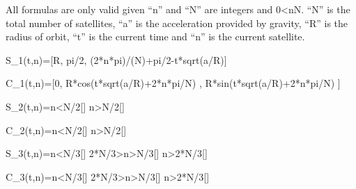 \centerline{All formulas are only valid given “n” and “N” are integers and 0<nN. “N” is the total number of satellites, “a” is the acceleration provided by gravity, “R” is the radius of orbit, “t” is the current time and “n” is the current satellite.}

\centerline{S_1(t,n)=[R, pi/2, (2*n*pi)/(N)+pi/2-t*sqrt(a/R)]}

\centerline{C_1(t,n)=[0, R*cos(t*sqrt(a/R)+2*n*pi/N) , R*sin(t*sqrt(a/R)+2*n*pi/N) ]}

\centerline{S_2(t,n)=n<N/2[]  n>N/2[]}

\centerline{C_2(t,n)=n<N/2[]  n>N/2[]}

\centerline{S_3(t,n)=n<N/3[]  2*N/3>n>N/3[]  n>2*N/3[]}

\centerline{C_3(t,n)=n<N/3[]  2*N/3>n>N/3[]  n>2*N/3[]}
